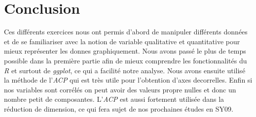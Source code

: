 \documentclass[10pt]{article}
\begin{document}
	\section{Conclusion}
	Ces différents exercices nous ont permis d'abord de manipuler différents données et de se familiariser avec la notion de variable qualitative et quantitative pour mieux représenter les donnes graphiquement. Nous avons passé le plus de temps possible dans la première partie afin de mieux comprendre les fonctionnalités du \textit{R} et surtout de \textit{ggplot}, ce qui a facilité notre analyse. Nous avons ensuite utilisé la méthode de l'\textit{ACP} qui est très utile pour l'obtention d'axes decorrelles. Enfin si nos variables sont corrélés on peut avoir des valeurs propre nulles et donc un nombre petit de composantes. L'\textit{ACP} est aussi fortement utilisée dans la réduction de dimension, ce qui fera sujet de nos prochaines études en SY09. 
\end{document}
